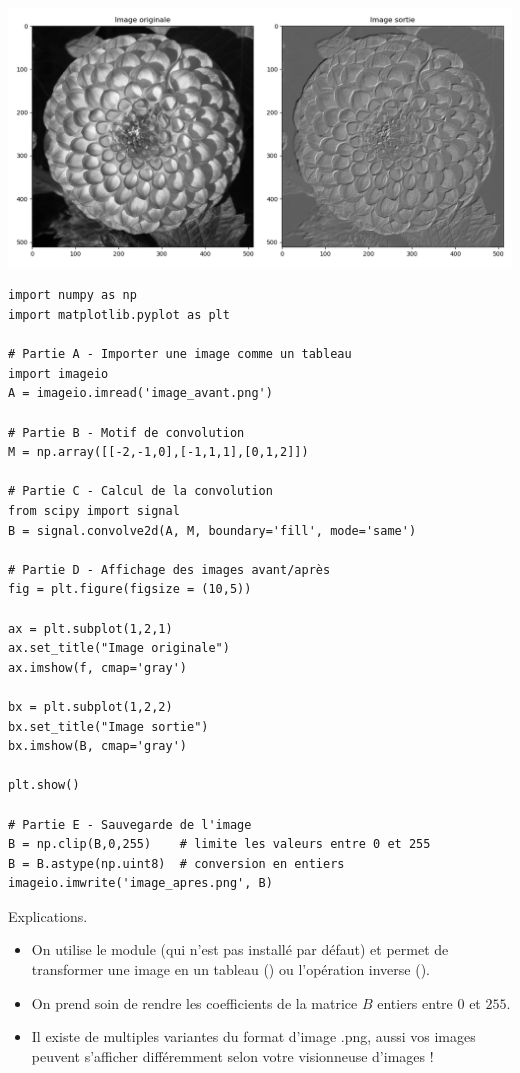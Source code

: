 \documentclass[11pt,class=report,crop=false]{standalone}
\begin{document}
\begin{center}
\includegraphics[scale=\myscale,scale=0.3]{figures/ecran-convolution-1}
\end{center}


\begin{lstlisting}
import numpy as np
import matplotlib.pyplot as plt

# Partie A - Importer une image comme un tableau
import imageio
A = imageio.imread('image_avant.png')

# Partie B - Motif de convolution
M = np.array([[-2,-1,0],[-1,1,1],[0,1,2]])

# Partie C - Calcul de la convolution
from scipy import signal
B = signal.convolve2d(A, M, boundary='fill', mode='same')

# Partie D - Affichage des images avant/après
fig = plt.figure(figsize = (10,5))

ax = plt.subplot(1,2,1)
ax.set_title("Image originale")
ax.imshow(f, cmap='gray')

bx = plt.subplot(1,2,2)
bx.set_title("Image sortie")
bx.imshow(B, cmap='gray')

plt.show()

# Partie E - Sauvegarde de l'image
B = np.clip(B,0,255)    # limite les valeurs entre 0 et 255
B = B.astype(np.uint8)  # conversion en entiers
imageio.imwrite('image_apres.png', B)
\end{lstlisting}

Explications.
\begin{itemize}
  \item On utilise le module  (qui n'est pas installé par défaut) et permet de transformer une image en un tableau \numpy{} () ou l'opération inverse ().
  \item On prend soin de rendre les coefficients de la matrice $B$ entiers entre $0$ et $255$.
  \item Il existe de multiples variantes du format d'image \og{}.png\fg{}, aussi vos images peuvent s'afficher différemment selon votre visionneuse d'images !
\end{itemize}
\end{document}
